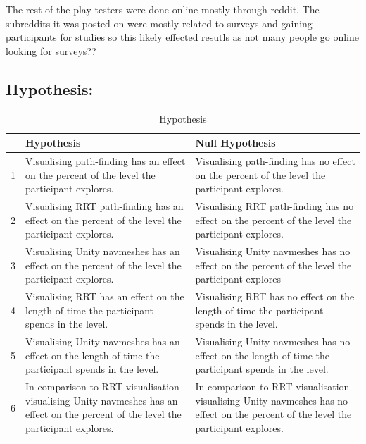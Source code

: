 \documentclass[journal]{IEEEtran}
\begin{document}
The rest of the play testers were done online mostly through reddit. The subreddits it was posted on were mostly related to surveys and gaining participants for studies so this likely effected resutls as not many people go online looking for surveys??  



\subsection{Hypothesis:} \label{hypothesis}
\begin{table}[h]
	\centering
	\caption{Hypothesis}
	\label{table:Hypothesis}
	\def\arraystretch{1.5}
	\begin{tabular}{|c|p{7.5cm}|p{7.5cm}|}
		\hline
		 & \textbf{Hypothesis}& \textbf{Null Hypothesis} \\
		\hline
		1 & Visualising path-finding has an effect on the percent of the level the participant explores.
			& Visualising path-finding has no effect on the percent of the level the participant explores.
		\\ \hline
		
		2 & Visualising RRT path-finding has an effect on the percent of the level the participant explores.
		& Visualising RRT path-finding has no effect on the percent of the level the participant explores.
		\\ \hline
		
		3 & Visualising Unity navmeshes has an effect on the percent of the level the participant explores.
		& Visualising Unity navmeshes has no effect on the percent of the level the participant explores
		\\ \hline
		
		4 & Visualising RRT has an effect on the length of time the participant spends in the level. 
		& Visualising RRT has no effect on the length of time the participant spends in the level. 
		\\ \hline
		
		5 & Visualising Unity navmeshes has an effect on the length of time the participant spends in the level. 
		& Visualising Unity navmeshes has no effect on the length of time the participant spends in the level.
		\\ \hline
		
		6 & In comparison to RRT visualisation visualising Unity navmeshes has an effect on the percent of the level the participant explores.
		& In comparison to RRT visualisation visualising Unity navmeshes has no effect on the percent of the level the participant explores.
		\\ \hline
		

\end{tabular}
\end{table}
\end{document}
